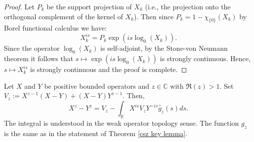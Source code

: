 \begin{proof}
        Let $P_k$ be the support projection of $X_k$ (i.e., the projection onto the orthogonal complement of the kernel of $X_k$). Then since $P_k = 1-\chi_{\{0\}}(X_k)$
        by Borel functional calculus we have:
        \begin{equation*}
            X_k^{is} = P_k\exp(is\log_0(X_k)).
        \end{equation*}
        Since the operator $\log_0(X_k)$ is self-adjoint, by the Stone-von Neumann theorem it follows that $s\mapsto \exp(is\log_0(X_k))$ is strongly
        continuous. Hence, $s\mapsto X_k^{is}$ is strongly continuous and the proof is complete.
    \end{proof}
    
    
    \begin{lem}\label{first integral formula} 
        Let $X$ and $Y$ be positive bounded operators and $z \in \mathbb{C}$ with $\Re(z) > 1$. Set $V_z := X^{z-1}(X-Y)+(X-Y)Y^{z-1}$. Then,
        \begin{equation*}
            X^z-Y^z=V_z-\int_{\mathbb{R}}X^{is}V_zY^{-is}\widehat{g}_z(s)ds.
        \end{equation*}
        The integral is understood in the weak operator topology sense. { The function $g_z$ is the same as in the statement of Theorem \ref{csz key lemma}.}
    \end{lem}
